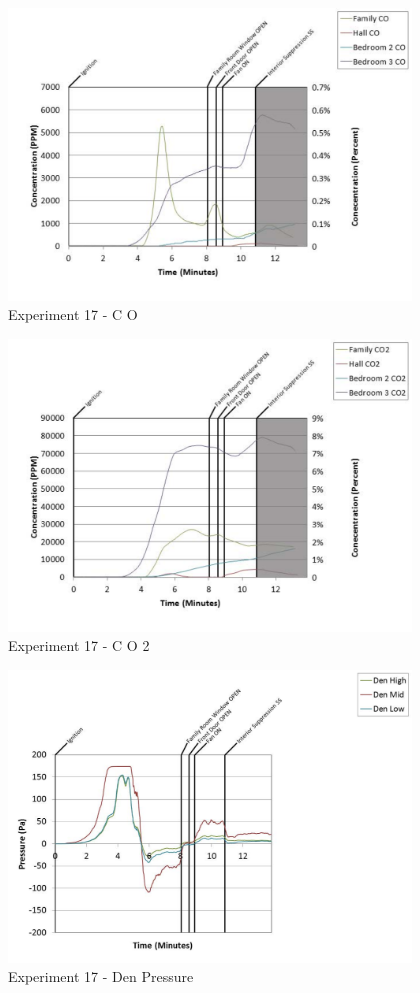 \documentclass{article}
\begin{document}
\begin{appendices}
	\clearpage

	\begin{figure}[h!]
		\centering
		\includegraphics[height=3.05in]{0_Images/Results_Charts/Exp_17_Charts/CO.pdf}
		\caption{Experiment 17 - C O}
	\end{figure}
 

	\begin{figure}[h!]
		\centering
		\includegraphics[height=3.05in]{0_Images/Results_Charts/Exp_17_Charts/CO2.pdf}
		\caption{Experiment 17 - C O 2}
	\end{figure}
 
	\clearpage

	\begin{figure}[h!]
		\centering
		\includegraphics[height=3.05in]{0_Images/Results_Charts/Exp_17_Charts/DenPressure.pdf}
		\caption{Experiment 17 - Den Pressure}
	\end{figure}
 


\end{appendices}
\end{document}
